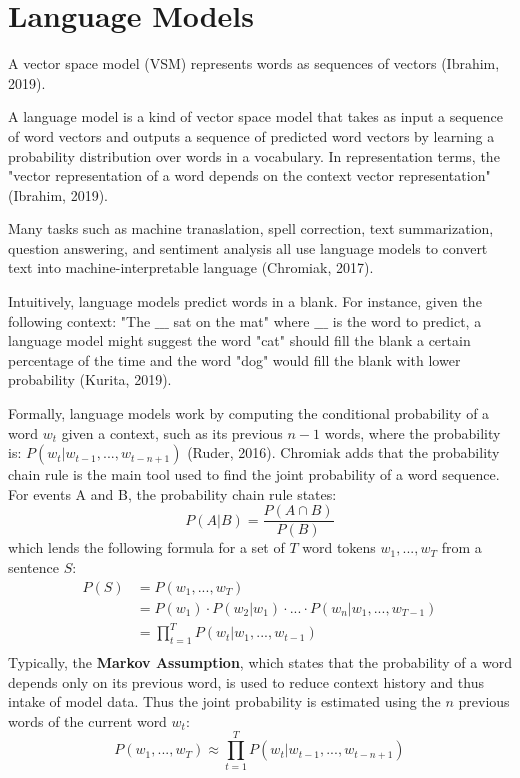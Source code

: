 \section{Language Models}

A vector space model (VSM) represents words as sequences of vectors (Ibrahim, 2019). 

A language model is a kind of vector space model that takes as input a sequence of word vectors and outputs a sequence of predicted word vectors by learning a probability distribution over words in a vocabulary. In representation terms, the "vector representation of a word depends on the context vector representation" (Ibrahim, 2019).

Many tasks such as machine tranaslation, spell correction, text summarization, question answering, and sentiment analysis all use language models to convert text into machine-interpretable language (Chromiak, 2017). 

Intuitively, language models predict words in a blank. For instance, given the following context: "The $\_\_\_$ sat on the mat" where $\_\_\_$ is the word to predict, a language model might suggest the word "cat" should fill the blank a certain percentage of the time and the word "dog" would fill the blank with lower probability (Kurita, 2019). 

Formally, language models work by computing the conditional probability of a word $w_t$ given a context, such as its previous $n-1$ words, where the probability is: $P(w_t | w_{t-1}, ..., w_{t-n+1})$ (Ruder, 2016). Chromiak adds that the probability chain rule is the main tool used to find the joint probability of a word sequence. For events A and B, the probability chain rule states:
$$
P(A | B) = \frac{P(A \cap B)} {P(B)}
$$
which lends the following formula for a set of $T$ word tokens $w_1, ..., w_T$ from a sentence $S$: 
$$
\begin{array}{ll}
P(S)
&= P(w_1, ..., w_T)  \\
&= P(w_1) \cdot P(w_2 | w_1) \cdot ... \cdot P(w_n | w_1, ..., w_{T-1}) \\
&= \prod_{t=1}^T P(w_t | w_1, ..., w_{t-1}) \\
\end{array}
$$
Typically, the \textbf{Markov Assumption}, which states that the probability of a word depends only on its previous word, is used to reduce context history and thus intake of model data. Thus the joint probability is estimated using the $n$ previous words of the current word $w_t$:
$$
P(w_1, ..., w_T) \approx \prod_{t=1}^T P(w_t | w_{t-1}, ..., w_{t-n+1})
$$

